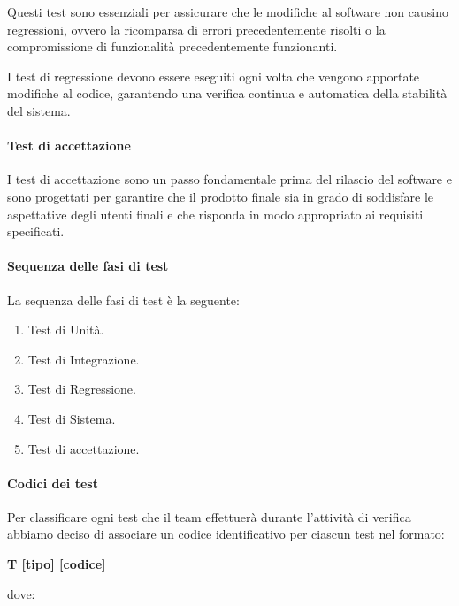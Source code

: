 Questi test sono essenziali per assicurare che le modifiche al software non causino regressioni, ovvero la ricomparsa di errori precedentemente risolti o la compromissione di funzionalità precedentemente funzionanti.

I test di regressione devono essere eseguiti ogni volta che vengono apportate modifiche al codice, garantendo una verifica continua e automatica della stabilità del sistema.

\paragraph{Test di accettazione}
I test di accettazione sono un passo fondamentale prima del rilascio del software e sono progettati per garantire che il prodotto finale sia in grado di soddisfare le aspettative degli utenti finali e che risponda in modo appropriato ai requisiti specificati.

\paragraph{Sequenza delle fasi di test}
La sequenza delle fasi di test è la seguente:

\begin{enumerate}
    \item Test di Unità.
    \item Test di Integrazione.
    \item Test di Regressione.
    \item Test di Sistema.
    \item Test di accettazione.
\end{enumerate}

\paragraph{Codici dei test}
Per classificare ogni test che il team effettuerà durante l'attività di verifica abbiamo deciso di associare un codice identificativo per ciascun test nel formato:

\begin{center}
    \textbf{T [tipo] [codice]}
\end{center}

dove:

